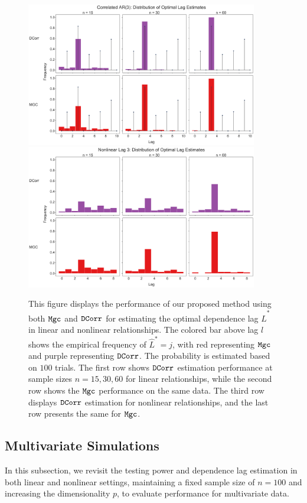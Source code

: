 \begin{figure}
    \centering
    \includegraphics[width=0.9\textwidth]{figures/mgcx/opt_lag_sim_corr_ar3.pdf}
    \includegraphics[width=0.9\textwidth]{figures/mgcx/opt_lag_sim_nonlin_lag3.pdf}
    \caption{This figure displays the performance of our proposed method using both $\mathtt{Mgc}$ and $\operatorname{\mathtt{DCorr}}$ for estimating the optimal dependence lag $\hat{L}^{*}$ in linear and nonlinear relationships. The colored bar above lag $l$ shows the empirical frequency of $\hat{L}^{*}=j$, with red representing $\mathtt{Mgc}$ and purple representing $\operatorname{\mathtt{DCorr}}$. The probability is estimated based on $100$ trials. The first row shows $\operatorname{\mathtt{DCorr}}$ estimation performance at sample sizes $n=15, 30, 60$ for linear relationships, while the second row shows the $\mathtt{Mgc}$ performance on the same data. The third row displays $\operatorname{\mathtt{DCorr}}$ estimation for nonlinear relationships, and the last row presents the same for $\mathtt{Mgc}$.
    } \label{fig:lag}
\end{figure}

\subsection{Multivariate Simulations}
In this subsection, we revisit the testing power and dependence lag estimation in both linear and nonlinear settings, maintaining a fixed sample size of $n=100$ and increasing the dimensionality $p$, to evaluate performance for multivariate data.

